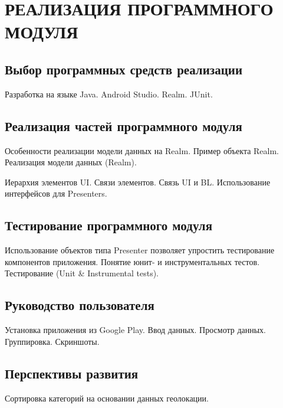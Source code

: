 \section[Реализация программного модуля]{%
  РЕАЛИЗАЦИЯ ПРОГРАММНОГО МОДУЛЯ
}\label{sec:implementation}

\subsection{Выбор программных средств реализации}

Разработка на языке Java. Android Studio.
Realm. JUnit.

\subsection{Реализация частей программного модуля}

Особенности реализации модели данных на Realm.
Пример объекта Realm.
Реализация  модели данных (Realm).

Иерархия элементов UI. Связи элементов.
Связь UI и BL. Использование интерфейсов для Presenters.


\subsection{Тестирование  программного модуля}

Использование объектов типа Presenter позволяет упростить
тестирование компонентов приложения.
Понятие юнит- и инструментальных тестов.
Тестирование (Unit \& Instrumental tests).

\subsection{Руководство пользователя}

Установка приложения из Google Play.
Ввод данных. Просмотр данных. Группировка.
Скриншоты.

\subsection{Перспективы развития}

Сортировка категорий на основании данных геолокации.
